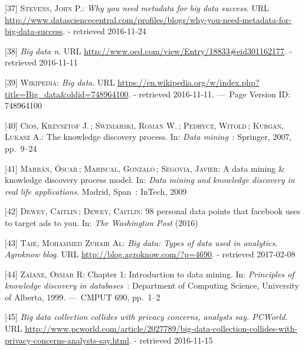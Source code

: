 \documentclass[12pt,english,a4paper,titlepage,cleardoublepage=empty,dottedtoc]{report}
\begin{document}
\hypertarget{ref-web_2016_why-you-need-metadata-for-big-data-to-success}{}
{[}37{]} \textsc{Stevens, John P.}: \emph{Why you need metadata for big
data success}. URL
\url{http://www.datasciencecentral.com/profiles/blogs/why-you-need-metadata-for-big-data-success}.
- retrieved 2016-11-24

\hypertarget{ref-web_2016_oxford_definition_big-data}{}
{[}38{]} \emph{Big data n.} URL
\url{http://www.oed.com/view/Entry/18833\#eid301162177}. - retrieved
2016-11-11

\hypertarget{ref-web_2016_wikipedia_definition_big-data}{}
{[}39{]} \textsc{Wikipedia}: \emph{Big data}. URL
\url{https://en.wikipedia.org/w/index.php?title=Big_data\&oldid=748964100}.
- retrieved 2016-11-11. ---~Page Version ID: 748964100

\hypertarget{ref-chapter_2007_the-knowledge-discovery-process}{}
{[}40{]} \textsc{Cios, Krzysztof J.}\,; \textsc{Swiniarski, Roman W.}\,;
\textsc{Pedrycz, Witold}\,; \textsc{Kurgan, Lukasz A.}: The knowledge
discovery process. In: \emph{Data mining}~: Springer, 2007, pp.~9--24

\hypertarget{ref-paper_2009_a-data-mining-knowledge-discovery-process-model}{}
{[}41{]} \textsc{Marbán, Óscar}\,; \textsc{Mariscal, Gonzalo}\,;
\textsc{Segovia, Javier}: A data mining \& knowledge discovery process
model. In: \emph{Data mining and knowledge discovery in real life
applications}. Madrid, Span~: InTech, 2009

\hypertarget{ref-web_2016_facebook-utilizes-98-data-points}{}
{[}42{]} \textsc{Dewey, Caitlin}\,; \textsc{Dewey, Caitlin}: 98 personal
data points that facebook uses to target ads to you. In: \emph{The
Washington Post} (2016)

\hypertarget{ref-web_2016_big-data-types-of-data-used-in-analytics}{}
{[}43{]} \textsc{Taie, Mohammed Zuhair Al}: \emph{Big data: Types of
data used in analytics. Agroknow blog}. URL
\url{http://blog.agroknow.com/?p=4690}. - retrieved 2017-02-08

\hypertarget{ref-book-chapter_1999_Principles-of-knowledge-discovery-in-databases_introduction-to-data-mining}{}
{[}44{]} \textsc{Zaïane, Osmar R}: Chapter 1: Introduction to data
mining. In: \emph{Principles of knowledge discovery in databases}~:
Department of Computing Science, University of Alberta, 1999. ---~CMPUT
690, pp.~1--2

\hypertarget{ref-web_2013_big-data-collection-collides-with-privacy-concerns}{}
{[}45{]} \emph{Big data collection collides with privacy concerns,
analysts say. PCWorld}. URL
\url{http://www.pcworld.com/article/2027789/big-data-collection-collides-with-privacy-concerns-analysts-say.html}.
- retrieved 2016-11-15
\end{document}
